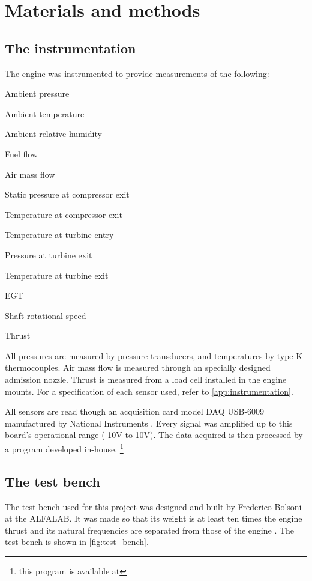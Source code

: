 \documentclass[tcc]{subfiles}
\begin{document}
\chapter{Materials and methods}
\label{ch:methods}

\section{The instrumentation}
The engine was instrumented to provide measurements of the following:
\begin{compactitem}
    \item Ambient pressure
    \item Ambient temperature
    \item Ambient relative humidity
    \item Fuel flow
    \item Air mass flow
    \item Static pressure at compressor exit
    \item Temperature at compressor exit
    \item Temperature at turbine entry
    \item Pressure at turbine exit
    \item Temperature at turbine exit
    \item \gls{EGT}
    \item Shaft rotational speed
    \item Thrust
\end{compactitem}

All pressures are measured by pressure transducers, and temperatures by type K thermocouples. 
Air mass flow is measured through an specially designed admission nozzle. 
Thrust is measured from a load cell installed in the engine mounts.
For a specification of each sensor used, refer to \cref{app:instrumentation}.

All sensors are read though an acquisition card 
model DAQ USB-6009 manufactured by National Instruments .
Every signal was amplified up to this board's operational range (-10V to 10V). 
The data acquired is then processed by a program developed in-house.%
\footnote{this program is available at }

\section{The test bench}

The test bench used for this project was designed and built by Frederico Bolsoni at the \gls{ALFALAB}.
It was made so that its weight is at least ten times the engine thrust 
 and its natural frequencies are separated from those of the engine \cite{bolsoni}.
The test bench is shown in \cref{fig:test_bench}.
\end{document}
